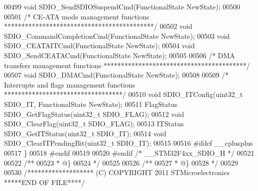 \begin{DoxyCode}
00499 \textcolor{keywordtype}{void} SDIO_SendSDIOSuspendCmd(FunctionalState NewState);
00500 
00501 \textcolor{comment}{/* CE-ATA mode management functions *******************************************/}
00502 \textcolor{keywordtype}{void} SDIO_CommandCompletionCmd(FunctionalState NewState);
00503 \textcolor{keywordtype}{void} SDIO_CEATAITCmd(FunctionalState NewState);
00504 \textcolor{keywordtype}{void} SDIO_SendCEATACmd(FunctionalState NewState);
00505 
00506 \textcolor{comment}{/* DMA transfers management functions *****************************************/}
00507 \textcolor{keywordtype}{void} SDIO_DMACmd(FunctionalState NewState);
00508 
00509 \textcolor{comment}{/* Interrupts and flags management functions **********************************/}
00510 \textcolor{keywordtype}{void} SDIO_ITConfig(uint32\_t SDIO\_IT, FunctionalState NewState);
00511 FlagStatus SDIO_GetFlagStatus(uint32\_t SDIO\_FLAG);
00512 \textcolor{keywordtype}{void} SDIO_ClearFlag(uint32\_t SDIO\_FLAG);
00513 ITStatus SDIO_GetITStatus(uint32\_t SDIO\_IT);
00514 \textcolor{keywordtype}{void} SDIO_ClearITPendingBit(uint32\_t SDIO\_IT);
00515 
00516 \textcolor{preprocessor}{#}\textcolor{preprocessor}{ifdef} \_\_cplusplus
00517 \}
00518 \textcolor{preprocessor}{#}\textcolor{preprocessor}{endif}
00519 
00520 \textcolor{preprocessor}{#}\textcolor{preprocessor}{endif} \textcolor{comment}{/* \_\_STM32F4xx\_SDIO\_H */}
00521 
00522 \textcolor{comment}{/**}
00523 \textcolor{comment}{  * @\}}
00524 \textcolor{comment}{  */}
00525 
00526 \textcolor{comment}{/**}
00527 \textcolor{comment}{  * @\}}
00528 \textcolor{comment}{  */}
00529 
00530 \textcolor{comment}{/******************* (C) COPYRIGHT 2011 STMicroelectronics *****END OF FILE****/}
\end{DoxyCode}
